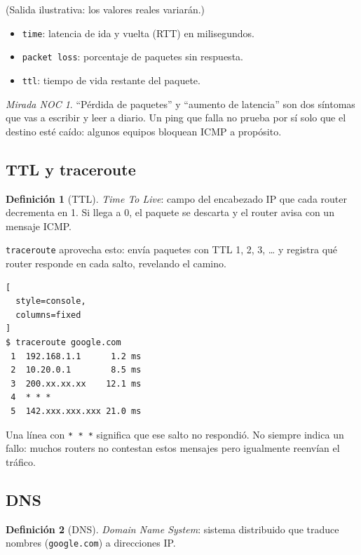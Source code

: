 \documentclass[11pt,a4paper]{article}
\theoremstyle{definition}
\newtheorem{definicion}{Definición}[section]
\theoremstyle{remark}
\newtheorem{noc}{Mirada NOC}[section]
\newcommand{\cmd}[1]{\texttt{#1}}
\begin{document}
(Salida ilustrativa: los valores reales variarán.)

\begin{itemize}
  \item \texttt{time}: latencia de ida y vuelta (RTT) en milisegundos.
  \item \texttt{packet loss}: porcentaje de paquetes sin respuesta.
  \item \texttt{ttl}: tiempo de vida restante del paquete.
\end{itemize}

\begin{noc}
``Pérdida de paquetes'' y ``aumento de latencia'' son dos síntomas que vas a escribir y leer a diario. Un ping que falla no prueba por sí solo que el destino esté caído: algunos equipos bloquean ICMP a propósito.
\end{noc}

\subsection{TTL y traceroute}

\begin{definicion}[TTL]
\emph{Time To Live}: campo del encabezado IP que cada router decrementa en 1. Si llega a 0, el paquete se descarta y el router avisa con un mensaje ICMP.
\end{definicion}

\cmd{traceroute} aprovecha esto: envía paquetes con TTL 1, 2, 3, \dots{} y registra qué router responde en cada salto, revelando el camino.

\begin{lstlisting}[
  style=console,
  columns=fixed
]
$ traceroute google.com
 1  192.168.1.1      1.2 ms
 2  10.20.0.1        8.5 ms
 3  200.xx.xx.xx    12.1 ms
 4  * * *
 5  142.xxx.xxx.xxx 21.0 ms
\end{lstlisting}

Una línea con \texttt{* * *} significa que ese salto no respondió. No siempre indica un fallo: muchos routers no contestan estos mensajes pero igualmente reenvían el tráfico.

\subsection{DNS}

\begin{definicion}[DNS]
\emph{Domain Name System}: sistema distribuido que traduce nombres (\texttt{google.com}) a direcciones IP.
\end{definicion}
\end{document}
